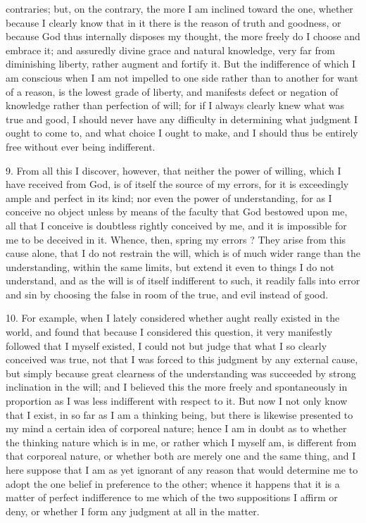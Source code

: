 contraries; but, on the contrary, the more I am inclined toward the one, whether because I clearly know that in it there is the reason of truth and goodness, or because God thus internally disposes my thought, the more freely do I choose and embrace it; and assuredly divine grace and natural knowledge, very far from diminishing liberty, rather augment and fortify it. But the indifference of which I am conscious when I am not impelled to one side rather than to another for want of a reason, is the lowest grade of liberty, and manifests defect or negation of knowledge rather than perfection of will; for if I always clearly knew what was true and good, I should never have any difficulty in determining what judgment I ought to come to, and what choice I ought to make, and I should thus be entirely free without ever being indifferent.

9. From all this I discover, however, that neither the power of willing, which I have received from God, is of itself the source of my errors, for it is exceedingly ample and perfect in its kind; nor even the power of understanding, for as I conceive no object unless by means of the faculty that God bestowed upon me, all that I conceive is doubtless rightly conceived by me, and it is impossible for me to be deceived in it. Whence, then, spring my errors ? They arise from this cause alone, that I do not restrain the will, which is of much wider range than the understanding, within the same limits, but extend it even to things I do not understand, and as the will is of itself indifferent to such, it readily falls into error and sin by choosing the false in room of the true, and evil instead of good.

10. For example, when I lately considered whether aught really existed in the world, and found that because I considered this question, it very manifestly followed that I myself existed, I could not but judge that what I so clearly conceived was true, not that I was forced to this judgment by any external cause, but simply because great clearness of the understanding was succeeded by strong inclination in the will; and I believed this the more freely and spontaneously in proportion as I was less indifferent with respect to it. But now I not only know that I exist, in so far as I am a thinking being, but there is likewise presented to my mind a certain idea of corporeal nature; hence I am in doubt as to whether the thinking nature which is in me, or rather which I myself am, is different from that corporeal nature, or whether both are merely one and the same thing, and I here suppose that I am as yet ignorant of any reason that would determine me to adopt the one belief in preference to the other; whence it happens that it is a matter of perfect indifference to me which of the two suppositions I affirm or deny, or whether I form any judgment at all in the matter.

